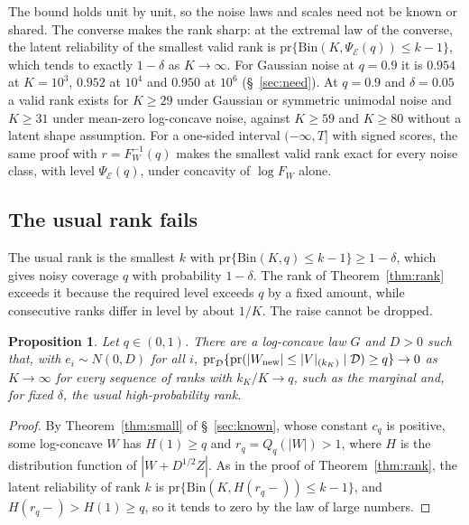 \documentclass[12pt]{article}
\newtheorem{proposition}{Proposition}
\theoremstyle{definition}
\newcommand{\pr}{\mathrm{pr}}
\newcommand{\E}{\mathcal{E}}
\newcommand{\Bin}{\mathrm{Bin}}
\begin{document}
The bound holds unit by unit, so the noise laws and scales need not be known or shared. The converse makes the rank sharp: at the extremal law of the converse, the latent reliability of the smallest valid rank is $\pr\{\Bin(K, \Psi_{\E}(q)) \le k - 1\}$, which tends to exactly $1 - \delta$ as $K \to \infty$. For Gaussian noise at $q = 0.9$ it is $0.954$ at $K = 10^3$, $0.952$ at $10^4$ and $0.950$ at $10^6$ (\S~\ref{sec:need}). At $q = 0.9$ and $\delta = 0.05$ a valid rank exists for $K \ge 29$ under Gaussian or symmetric unimodal noise and $K \ge 31$ under mean-zero log-concave noise, against $K \ge 59$ and $K \ge 80$ without a latent shape assumption. For a one-sided interval $(-\infty, T]$ with signed scores, the same proof with $r = F_W^{-1}(q)$ makes the smallest valid rank exact for every noise class, with level $\Psi_{\E}(q)$, under concavity of $\log F_W$ alone.

\subsection{The usual rank fails}

The usual rank is the smallest $k$ with $\pr\{\Bin(K, q) \le k - 1\} \ge 1 - \delta$, which gives noisy coverage $q$ with probability $1 - \delta$. The rank of Theorem~\ref{thm:rank} exceeds it because the required level exceeds $q$ by a fixed amount, while consecutive ranks differ in level by about $1/K$. The raise cannot be dropped.

\begin{proposition}\label{prop:fail}
Let $q \in (0,1)$. There are a log-concave law $G$ and $D > 0$ such that, with $e_i \sim N(0, D)$ for all $i$, $\pr_{\mathcal D}\{\pr(|W_{\rm new}| \le |V|_{(k_K)} \mid \mathcal D) \ge q\} \to 0$ as $K \to \infty$ for every sequence of ranks with $k_K/K \to q$, such as the marginal and, for fixed $\delta$, the usual high-probability rank.
\end{proposition}

\begin{proof}
By Theorem~\ref{thm:small} of \S~\ref{sec:known}, whose constant $c_q$ is positive, some log-concave $W$ has $H(1) \ge q$ and $r_q = Q_q(|W|) > 1$, where $H$ is the distribution function of $|W + D^{1/2}Z|$. As in the proof of Theorem~\ref{thm:rank}, the latent reliability of rank $k$ is $\pr\{\Bin(K, H(r_q-)) \le k - 1\}$, and $H(r_q-) > H(1) \ge q$, so it tends to zero by the law of large numbers.
\end{proof}
\end{document}
